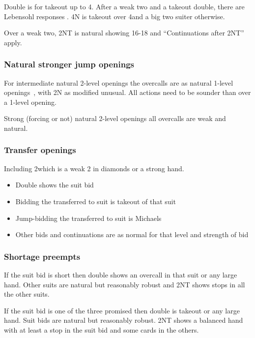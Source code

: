 \documentclass[a4paper,14pt]{extarticle}
\begin{document}
Double is for takeout up to 4\hearts. After a weak two and a takeout double, there
are Lebensohl responses . 4N is takeout over 4\spades and a big two suiter otherwise.

Over a weak two,  2NT is natural showing 16-18 and ``Continuations after 2NT'' 
apply.

\subsubsection{Natural stronger jump openings}
\label{sec:def:inter-strong}

For intermediate natural 2-level openings the overcalls are as natural 1-level
openings~, with 2N as modified unusual. All actions need to be
sounder than over a 1-level opening.

Strong (forcing or not) natural 2-level openings all overcalls are weak and natural.

\subsubsection{Transfer openings}
\label{sec:def:transfer}

Including 2\clubs which is a weak 2 in diamonds or a strong hand.

\begin{itemize}
\item Double shows the suit bid
\item Bidding the transferred to suit is takeout of that suit
\item Jump-bidding the transferred to suit is Michaels
\item Other bids and continuations are as normal for that level and strength of bid
\end{itemize}

\subsubsection{Shortage preempts}

If the suit bid is short then double shows an overcall in that suit or any
large hand.  Other suits are natural but reasonably robust and 2NT shows stops
in all the other suits.

If the suit bid is one of the three promised then double is takeout or any large hand.
Suit bids are natural but reasonably robust. 2NT shows a balanced hand with at 
least a stop in the suit bid and some cards in the others.
\end{document}
